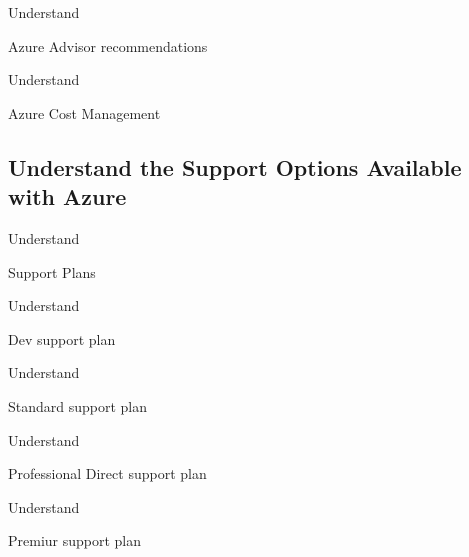 \documentclass{scrartcl}
\newenvironment{flashcard}[2][]{%
    #1
    \vfill
    \centerline{\Large{#2}}
    \vfill
    \newpage
}
{\newpage}
\newcommand{\subsectioncard}[1]{
    \vspace*{\stretch{1}}
    \subsection{#1}
    \vspace*{\stretch{1}}
    \pagebreak
}
\begin{document}
    \begin{flashcard}[Understand]{Azure Advisor recommendations}

    \end{flashcard}

    \begin{flashcard}[Understand]{Azure Cost Management}

    \end{flashcard}

    \subsectioncard{Understand the Support Options Available with Azure}

    \begin{flashcard}[Understand]{Support Plans}

    \end{flashcard}

    \begin{flashcard}[Understand]{Dev support plan}

    \end{flashcard}

    \begin{flashcard}[Understand]{Standard support plan}

    \end{flashcard}

    \begin{flashcard}[Understand]{Professional Direct support plan}

    \end{flashcard}

    \begin{flashcard}[Understand]{Premiur support plan}

    \end{flashcard}
\end{document}

